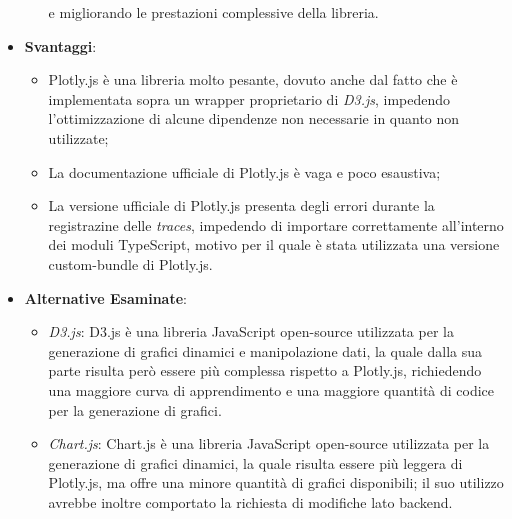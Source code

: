 \begin{itemize}
\begin{itemize}
                        e migliorando le prestazioni complessive della libreria.
            \end{itemize}
      \item \textbf{Svantaggi}:
            \begin{itemize}
                  \item Plotly.js è una libreria molto pesante, dovuto anche dal fatto che è implementata sopra un wrapper proprietario di \textit{D3.js},
                        impedendo l'ottimizzazione di alcune dipendenze non necessarie in quanto non utilizzate;
                  \item La documentazione ufficiale di Plotly.js è vaga e poco esaustiva;
                  \item La versione ufficiale di Plotly.js presenta degli errori durante la registrazine delle \textit{traces}, impedendo di importare correttamente
                         all'interno dei moduli TypeScript, motivo per il quale è stata utilizzata una versione custom-bundle di Plotly.js.
            \end{itemize}
      \item \textbf{Alternative Esaminate}:
            \begin{itemize}
                  \item \textit{D3.js}: D3.js è una libreria JavaScript open-source utilizzata per la generazione di grafici dinamici e manipolazione dati, la quale dalla sua parte risulta però
                        essere più complessa rispetto a Plotly.js, richiedendo una maggiore curva di apprendimento e una maggiore quantità di codice per la generazione di grafici.
                  \item \textit{Chart.js}: Chart.js è una libreria JavaScript open-source utilizzata per la generazione di grafici dinamici, la quale risulta essere più leggera di Plotly.js,
                        ma offre una minore quantità di grafici disponibili; il suo utilizzo avrebbe inoltre comportato la richiesta di modifiche lato backend.
            \end{itemize}
\end{itemize}

